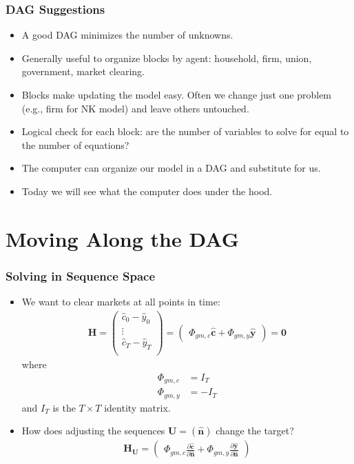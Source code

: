 \documentclass[english,xcolor=svgnames]{beamer}
\begin{document}
	\begin{frame}
		\frametitle{DAG Suggestions}
			\begin{itemize}
				\item A good DAG minimizes the number of unknowns.
				\item Generally useful to organize blocks by agent: household, firm, union, government, market clearing.
				\item Blocks make updating the model easy. Often we change just one problem (e.g., firm for NK model) and leave others untouched.
				\item Logical check for each block: are the number of variables to solve for equal to the number of equations?
				\item The computer can organize our model in a DAG and substitute for us.
				\item Today we will see what the computer does under the hood.
			\end{itemize}
	\end{frame}

\section{Moving Along the DAG}

	\begin{frame}
		\frametitle{Solving in Sequence Space}
			\begin{itemize}
				\item We want to clear markets at all points in time:
				\begin{align*}
					\mathbf{H} = \begin{pmatrix}
						\hat{c}_0 - \hat{y}_0 \\
						\vdots \\
						\hat{c}_T  - \hat{y}_T \\
					\end{pmatrix} = \begin{pmatrix}
						\Phi_{gm,c}\mathbf{\hat{c}} +  \Phi_{gm,y}\mathbf{\hat{y}} 
					\end{pmatrix} = \mathbf{0}
				\end{align*}
				where
				\begin{align*}
					\Phi_{gm,c} &= I_T \\
					\Phi_{gm,y} &= -I_T
				\end{align*}
				and $I_T$ is the $T\times T$ identity matrix.
				\item How does adjusting the sequences $\mathbf{U} = (\mathbf{\hat{n}})$ change the target?
				\begin{align*}
					\mathbf{H}_{\mathbf{U}} = \begin{pmatrix}
						\Phi_{gm,c}\frac{\partial\mathbf{\hat{c}}}{\partial \mathbf{\hat{n}} } + \Phi_{gm,y}\frac{\partial\mathbf{\hat{y}}}{\partial \mathbf{\hat{n}} }
					\end{pmatrix}
				\end{align*}
			\end{itemize}
	\end{frame}
	
\end{document}
